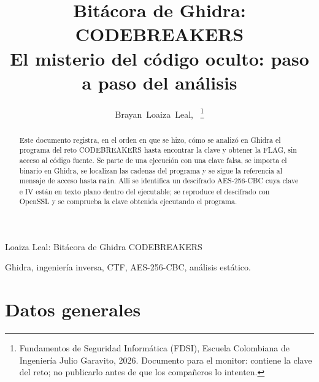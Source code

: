 \documentclass[journal]{IEEEtran}
\begin{document}
\title{Bit\'acora de Ghidra: CODEBREAKERS\\
\large El misterio del c\'odigo oculto: paso a paso del an\'alisis}

\author{Brayan~Loaiza~Leal,~%
\thanks{Fundamentos de Seguridad Inform\'atica (FDSI), Escuela Colombiana de
Ingenier\'ia Julio Garavito, 2026. Documento para el monitor: contiene la clave
del reto; no publicarlo antes de que los compa\~neros lo intenten.}}

%
{Loaiza Leal: Bit\'acora de Ghidra CODEBREAKERS}

\maketitle

\begin{abstract}
Este documento registra, en el orden en que se hizo, c\'omo se analiz\'o en Ghidra
el programa del reto CODEBREAKERS hasta encontrar la clave y obtener la FLAG, sin
acceso al c\'odigo fuente. Se parte de una ejecuci\'on con una clave falsa, se
importa el binario en Ghidra, se localizan las cadenas del programa y se sigue la
referencia al mensaje de acceso hasta \texttt{main}. All\'i se identifica un
descifrado AES-256-CBC cuya clave e IV est\'an en texto plano dentro del
ejecutable; se reproduce el descifrado con OpenSSL y se comprueba la clave
obtenida ejecutando el programa.
\end{abstract}

\begin{IEEEkeywords}
Ghidra, ingenier\'ia inversa, CTF, AES-256-CBC, an\'alisis est\'atico.
\end{IEEEkeywords}

\IEEEpeerreviewmaketitle

\section{Datos generales}
\end{document}
